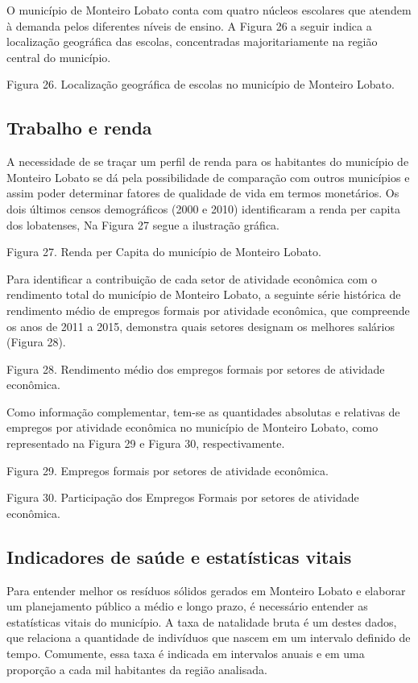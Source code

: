 O município de Monteiro Lobato conta com quatro núcleos escolares que atendem à demanda pelos diferentes níveis de ensino. A Figura 26 a seguir indica a localização geográfica das escolas, concentradas majoritariamente na região central do município. 
 
Figura 26. Localização geográfica de escolas no município de Monteiro Lobato.

\subsection{Trabalho e renda}

A necessidade de se traçar um perfil de renda para os habitantes do município de Monteiro Lobato se dá pela possibilidade de comparação com outros municípios e assim poder determinar fatores de qualidade de vida em termos monetários. Os dois últimos censos demográficos (2000 e 2010) identificaram a renda per capita dos lobatenses, Na Figura 27 segue a ilustração gráfica.
 
Figura 27. Renda per Capita do município de Monteiro Lobato.

Para identificar a contribuição de cada setor de atividade econômica com o rendimento total do município de Monteiro Lobato, a seguinte série histórica de rendimento médio de empregos formais por atividade econômica, que compreende os anos de 2011 a 2015, demonstra quais setores designam os melhores salários (Figura 28).
 
Figura 28. Rendimento médio dos empregos formais por setores de atividade econômica.

Como informação complementar, tem-se as quantidades absolutas e relativas de empregos por atividade econômica no município de Monteiro Lobato, como representado na Figura 29 e Figura 30, respectivamente.
 
Figura 29. Empregos formais por setores de atividade econômica.
 
Figura 30. Participação dos Empregos Formais por setores de atividade econômica.

\subsection{Indicadores de saúde e estatísticas vitais}

Para entender melhor os resíduos sólidos gerados em Monteiro Lobato e elaborar um planejamento público a médio e longo prazo, é necessário entender as estatísticas vitais do município. A taxa de natalidade bruta é um destes dados, que relaciona a quantidade de indivíduos que nascem em um intervalo definido de tempo. Comumente, essa taxa é indicada em intervalos anuais e em uma proporção a cada mil habitantes da região analisada. 

